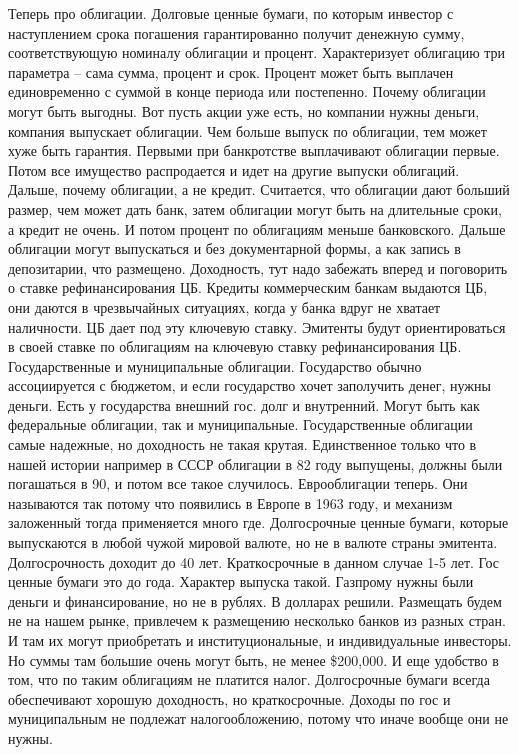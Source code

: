 \documentclass[a4paper, 12pt]{article}
\begin{document}
Теперь про облигации. Долговые ценные бумаги, по которым инвестор с наступлением срока погашения гарантированно получит денежную сумму, соответствующую номиналу облигации и процент. Характеризует облигацию три параметра -- сама сумма, процент и срок. Процент может быть выплачен единовременно с суммой в конце периода или постепенно. Почему облигации могут быть выгодны. Вот пусть акции уже есть, но компании нужны деньги, компания выпускает облигации. Чем больше выпуск по облигации, тем может хуже быть гарантия. Первыми при банкротстве выплачивают облигации первые. Потом все имущество распродается и идет на другие выпуски облигаций. Дальше, почему облигации, а не кредит. Считается, что облигации дают больший размер, чем может дать банк, затем облигации могут быть на длительные сроки, а кредит не очень. И потом процент по облигациям меньше банковского. Дальше облигации могут выпускаться и без документарной формы, а как запись в депозитарии, что размещено. Доходность, тут надо забежать вперед и поговорить о ставке рефинансирования ЦБ. Кредиты коммерческим банкам выдаются ЦБ, они даются в чрезвычайных ситуациях, когда у банка вдруг не хватает наличности. ЦБ дает под эту ключевую ставку. Эмитенты будут ориентироваться в своей ставке по облигациям на ключевую ставку рефинансирования ЦБ. Государственные и муниципальные облигации. Государство обычно ассоциируется с бюджетом, и если государство хочет заполучить денег, нужны деньги. Есть у государства внешний гос. долг и внутренний. Могут быть как федеральные облигации, так и муниципальные. Государственные облигации самые надежные, но доходность не такая крутая. Единственное только что в нашей истории например в СССР облигации в 82 году выпущены, должны были погашаться в 90, и потом все такое случилось. Еврооблигации теперь. Они называются так потому что появились в Европе в 1963 году, и механизм заложенный тогда применяется много где. Долгосрочные ценные бумаги, которые выпускаются в любой чужой мировой валюте, но не в валюте страны эмитента. Долгосрочность доходит до 40 лет. Краткосрочные в данном случае 1-5 лет. Гос ценные бумаги это до года. Характер выпуска такой. Газпрому нужны были деньги и финансирование, но не в рублях. В долларах решили. Размещать будем не на нашем рынке, привлечем к размещению несколько банков из разных стран. И там их могут приобретать и институциональные, и индивидуальные инвесторы. Но суммы там большие очень могут быть, не менее \$200,000. И еще удобство в том, что по таким облигациям не платится налог. Долгосрочные бумаги всегда обеспечивают хорошую доходность, но краткосрочные. Доходы по гос и муниципальным не подлежат налогообложению, потому что иначе вообще они не нужны. 
\end{document}
